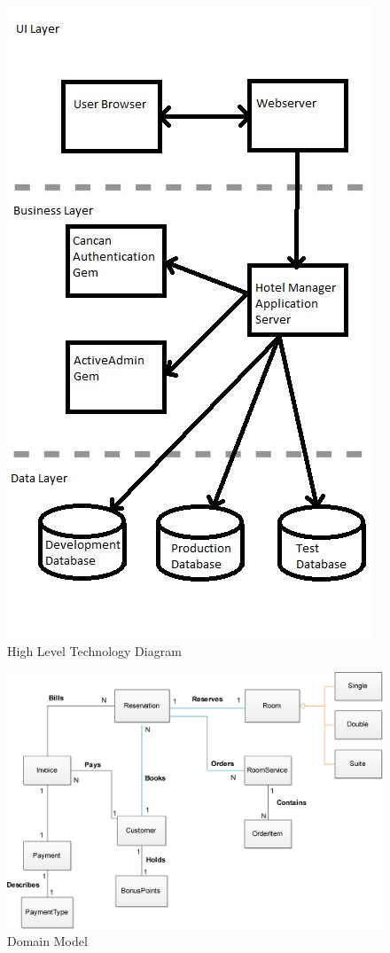 \begin{figure}[ht]
	\includegraphics[scale=0.9]{images/high_level_technology_diagram}
	\caption{High Level Technology Diagram}
\end{figure}
\begin{figure}[ht]
	\includegraphics[scale=0.9]{images/domain_model}
	\caption{Domain Model}
\end{figure}

